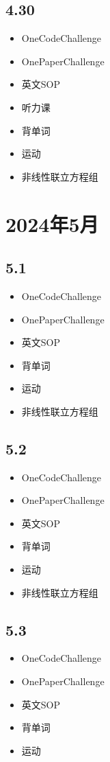 \documentclass[UTF8]{ctexart}
\begin{document}
\subsection*{4.30}
\begin{itemize}
    \item OneCodeChallenge
    \item OnePaperChallenge
    \item 英文SOP
    \item 听力课
    \item 背单词
    \item 运动
    \item 非线性联立方程组
\end{itemize}

\section{2024年5月}

\subsection*{5.1}
\begin{itemize}
    \item OneCodeChallenge
    \item OnePaperChallenge
    \item 英文SOP
    \item 背单词
    \item 运动
    \item 非线性联立方程组
\end{itemize}

\subsection*{5.2}
\begin{itemize}
    \item OneCodeChallenge
    \item OnePaperChallenge
    \item 英文SOP
    \item 背单词
    \item 运动
    \item 非线性联立方程组
\end{itemize}

\subsection*{5.3}
\begin{itemize}
    \item OneCodeChallenge
    \item OnePaperChallenge
    \item 英文SOP
    \item 背单词
    \item 运动
\end{itemize}
\end{document}
